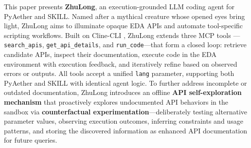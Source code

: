 \documentclass[anonymous, sigconf]{acmart}
\begin{document}
This paper presents \textbf{ZhuLong}, an execution-grounded LLM coding agent for PyAether and SKILL. Named after a mythical creature whose opened eyes bring light, ZhuLong aims to illuminate opaque EDA APIs and automate tool-specific scripting workflows. Built on Cline-CLI \cite{cline2024cline}, ZhuLong extends three MCP tools \cite{lee2025autoeda}—\texttt{search\_apis}, \texttt{get\_api\_details}, and \texttt{run\_code}—that form a closed loop: retrieve candidate APIs, inspect their documentation, execute code in the EDA environment with execution feedback, and iteratively refine based on observed errors or outputs. All tools accept a unified \texttt{lang} parameter, supporting both PyAether and SKILL with identical agent logic. To further address incomplete or outdated documentation, ZhuLong introduces an offline \textbf{API self-exploration mechanism} that proactively explores undocumented API behaviors in the sandbox via \textbf{counterfactual experimentation}—deliberately testing alternative parameter values, observing execution outcomes, inferring constraints and usage patterns, and storing the discovered information as enhanced API documentation for future queries.
\end{document}
